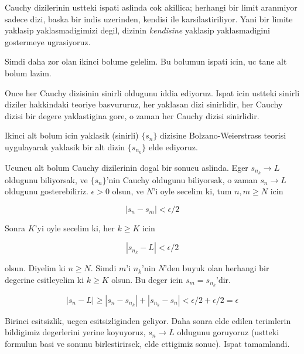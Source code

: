 \documentclass[12pt,fleqn]{article}\usepackage{../common}
\begin{document}
Cauchy dizilerinin ustteki ispati aslinda cok akillica; herhangi bir limit
aranmiyor sadece dizi, baska bir indis uzerinden, kendisi ile
karsilastiriliyor. Yani bir limite yaklasip yaklasmadigimizi degil, dizinin
{\em kendisine} yaklasip yaklasmadigini gostermeye ugrasiyoruz. 

Simdi daha zor olan ikinci bolume gelelim. Bu bolumun ispati icin, uc
tane alt bolum lazim. 

Once her Cauchy dizisinin sinirli oldugunu iddia ediyoruz. Ispat icin
ustteki sinirli diziler hakkindaki teoriye basvururuz, her yaklasan dizi
sinirlidir, her Cauchy dizisi bir degere yaklastigina gore, o zaman her
Cauchy dizisi sinirlidir.

Ikinci alt bolum icin yaklasik (sinirli) $\{s_n\}$ dizisine Bolzano-Weierstrass
teorisi uygulayarak yaklasik bir alt dizin $\{s_{n_k}\}$ elde ediyoruz. 

Ucuncu alt bolum Cauchy dizilerinin dogal bir sonucu aslinda. Eger
 $s_{n_k}
\to L$ oldugunu biliyorsak, ve $\{s_n\}$'nin Cauchy oldugunu biliyorsak, o
zaman $s_n \to L$ oldugunu gosterebiliriz. $\epsilon > 0$ olsun, ve $N$'i
oyle secelim ki, tum $n,m \ge N$ icin

\[ |s_n - s_m| < \epsilon/2 \]

Sonra $K$'yi oyle secelim ki, her $k \ge K$ icin

\[ |s_{n_k} - L| < \epsilon/2 \]

olsun. Diyelim ki $n \ge N$. Simdi $m$'i $n_k$'nin $N$'den buyuk olan herhangi
bir degerine esitleyelim ki $k \ge K$ olsun. Bu deger icin $s_m =
s_{n_k}$'dir. 

\[ |s_n - L| \ge |s_n - s_{n_k}| + |s_{n_k} - s_n| < 
\epsilon/2 + \epsilon/2 = \epsilon 
\]

Birinci esitsizlik, ucgen esitsizliginden geliyor. Daha sonra elde edilen
terimlerin bildigimiz degerlerini yerine koyuyoruz, $s_n \to L$ oldugunu
goruyoruz (ustteki formulun basi ve sonunu birlestirirsek, elde ettigimiz
sonuc). Ispat tamamlandi. 
\end{document}

